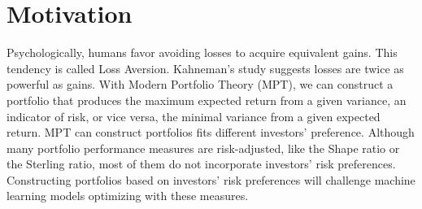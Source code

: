 \section {Motivation}
Psychologically, humans favor avoiding losses to acquire equivalent gains. This tendency is called Loss Aversion.\cite{kahneman2000analysis} Kahneman's study suggests losses are twice as powerful as gains\cite{Tversky1992}. With Modern Portfolio Theory (MPT), we can construct a portfolio that produces the maximum expected return from a given variance, an indicator of risk, or vice versa, the minimal variance from a given expected return\cite{10.2307/2975974}. MPT can construct portfolios fits different investors' preference.
Although many portfolio performance measures are risk-adjusted\cite{cogneau2009101}, like the Shape ratio\cite{Sharpe49} or the Sterling ratio\cite{magdon2004maximum}, most of them do not incorporate investors' risk preferences. Constructing portfolios based on investors' risk preferences will challenge machine learning models optimizing with these measures.